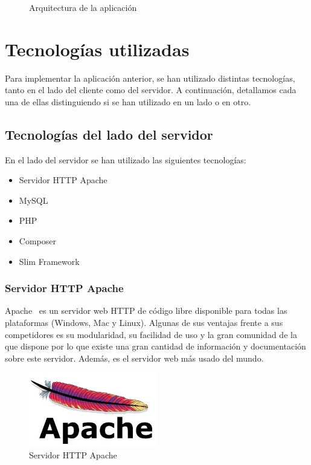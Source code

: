 \begin{figure}[htb]
\centering
\arquitectura
\caption{Arquitectura de la aplicación}
\label{fig:arquitectura}
\end{figure}

\section{Tecnologías utilizadas}

Para implementar la aplicación anterior, se han utilizado distintas tecnologías, tanto en el lado del cliente como del servidor. A continuación, detallamos cada una de ellas distinguiendo si se han utilizado en un lado o en otro.

\subsection{Tecnologías del lado del servidor}

En el lado del servidor se han utilizado las siguientes tecnologías:

\begin{itemize}
\item Servidor HTTP Apache
\item MySQL
\item PHP
\item Composer
\item Slim Framework
\end{itemize}

\subsubsection*{Servidor HTTP Apache}

Apache~\cite{apache} es un servidor web HTTP de código libre disponible para todas las plataformas (Windows, Mac y Linux). Algunas de sus ventajas frente a sus competidores es su modularidad, su facilidad de uso y la gran comunidad de la que dispone por lo que existe una gran cantidad de información y documentación sobre este servidor. Además, es el servidor web más usado del mundo.

\begin{figure}[tbh]
\centering
\label{fig:apache}
\includegraphics[width=0.5\textwidth]{imagenes/apache}
\caption{Servidor HTTP Apache}
\end{figure}

